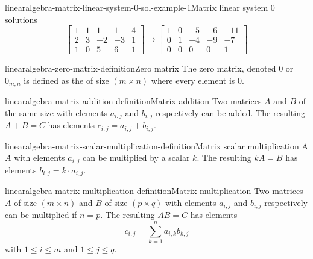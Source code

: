 \documentclass[preview]{standalone}
\begin{document}
\begin{snippetexample}{linearalgebra-matrix-linear-system-0-sol-example-1}{Matrix linear system 0 solutions}
    \[
        \begin{bmatrix}
            1 & 1 & 1 & 1 & 4 \\
            2 & 3 & -2 & -3 & 1 \\
            1 & 0 & 5 & 6 & 1
        \end{bmatrix}
        \rightarrow
        \begin{bmatrix}
            1 & 0 & -5 & -6 & -11 \\
            0 & 1 & -4 & -9 & -7 \\
            0 & 0 & 0 & 0 & 1
        \end{bmatrix}
    \]
\end{snippetexample}

\begin{snippetdefinition}{linearalgebra-zero-matrix-definition}{Zero matrix}
    The zero matrix, denoted \(0\) or \(0_{m,n}\)
    is defined as the \matrix of size \((m \times n)\)
    where every element is \(0\).
\end{snippetdefinition}

\begin{snippetdefinition}{linearalgebra-matrix-addition-definition}{Matrix addition}
    Two matrices \(A\) and \(B\) of the same size
    with elements \(a_{i,j}\) and \(b_{i,j}\) respectively
    can be added. The resulting \matrix \(A+B=C\)
    has elements \(c_{i,j} = a_{i,j} + b_{i,j}\).
\end{snippetdefinition}

\begin{snippetdefinition}{linearalgebra-matrix-scalar-multiplication-definition}{Matrix scalar multiplication}
    A \matrix \(A\) with elements \(a_{i,j}\)
    can be multiplied by a scalar \(k\).
    The resulting \matrix \(kA=B\) has elements
    \(b_{i,j} = k \cdot a_{i,j}\).
\end{snippetdefinition}

\begin{snippetdefinition}{linearalgebra-matrix-multiplication-definition}{Matrix multiplication}
    Two matrices \(A\) of size \((m \times n)\) and
    \(B\) of size \((p \times q)\)
    with elements \(a_{i,j}\) and \(b_{i,j}\) respectively
    can be multiplied if \(n=p\).
    The resulting \matrix \(AB=C\) has elements
    \[
        c_{i,j} = \sum_{k=1}^n
        a_{i,k}b_{k,j}
    \]
    with \(1 \leq i \leq m\)
    and \(1 \leq j \leq q\).
\end{snippetdefinition}
\end{document}
